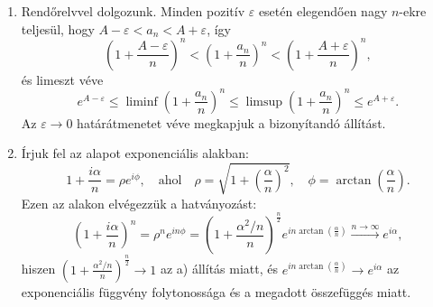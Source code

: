 \documentclass[11pt]{scrartcl}
\begin{document}
\begin{enumerate}
	\item Rendőrelvvel dolgozunk. Minden pozitív $\varepsilon$ esetén
	      elegendően nagy $n$-ekre teljesül, hogy
	      $A - \varepsilon < a_n < A + \varepsilon$, így
	      \[
		      \left(1 + \frac{A - \varepsilon}{n}\right)^n
		      < \left(1 + \frac{a_n}{n}\right)^n
		      < \left(1 + \frac{A + \varepsilon}{n}\right)^n,
	      \]
	      és limeszt véve
	      \[
		      e^{A - \varepsilon}
		      \le \liminf \left(1 + \frac{a_n}{n}\right)^n
		      \le \limsup \left(1 + \frac{a_n}{n}\right)^n
		      \le e^{A + \varepsilon}.
	      \]
	      Az $\varepsilon \to 0$ határátmenetet véve megkapjuk a bizonyítandó
	      állítást.

	\item Írjuk fel az alapot exponenciális alakban:
	      \[
		      1 + \frac{i\alpha}{n} = \rho e^{i\phi}, \quad \text{ahol} \quad
		      \rho = \sqrt{1 + \left(\frac{\alpha}{n}\right)^2}, \quad
		      \phi = \arctan\left(\frac{\alpha}{n}\right).
	      \]
	      Ezen az alakon elvégezzük a hatványozást:
	      \[
		      \left(1 + \frac{i\alpha}{n}\right)^n
		      = \rho^n e^{in\phi}
		      = \left(1 + \frac{\alpha^2 / n}{n}\right)^{\frac{n}{2}}
		      e^{in \arctan\left(\frac{\alpha}{n}\right)}
		      \xrightarrow{n \to \infty} e^{i\alpha},
	      \]
	      hiszen
	      \(
	      \left(1 + \frac{\alpha^2 / n}{n}\right)^{\frac{n}{2}} \to 1
	      \)
	      az a) állítás miatt, és
	      \(
	      e^{in \arctan\left(\frac{\alpha}{n}\right)} \to e^{i\alpha}
	      \)
	      az exponenciális függvény folytonossága és a megadott összefüggés
	      miatt.
\end{enumerate}
\end{document}
